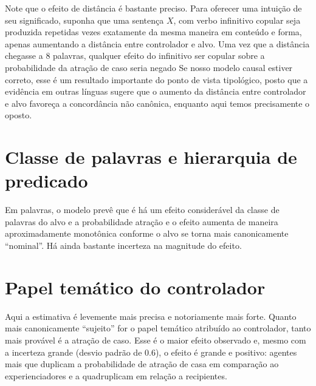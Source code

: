 \documentclass[a4paper, 12pt, article]{memoir}
\begin{document}
Note que o efeito de distância é bastante preciso.
Para oferecer uma intuição de seu significado, suponha que uma sentença $X$, com
verbo infinitivo copular seja produzida repetidas vezes exatamente da mesma
maneira em conteúdo e forma, apenas aumentando a distância entre controlador e
alvo.
Uma vez que a distância chegasse a 8 palavras, qualquer efeito do
infinitivo ser copular sobre a probabilidade da atração de caso seria negado
Se nosso modelo causal estiver correto, esse é um resultado importante do ponto
de vista tipológico, posto que a evidência em outras línguas sugere que o
aumento da distância entre controlador e alvo favoreça a concordância não
canônica, enquanto aqui temos precisamente o oposto.


\section{Classe de palavras e hierarquia de predicado} %

Em palavras, o modelo prevê que é há um efeito considerável da classe de
palavras do alvo e a probabilidade atração e o efeito aumenta de maneira
aproximadamente monotônica conforme o alvo se torna mais canonicamente
``nominal''.
Há ainda bastante incerteza na magnitude do efeito.

\begin{center}
  
  \bigskip
  
\end{center}


\section{Papel temático do controlador} %

Aqui a estimativa é levemente mais precisa e notoriamente mais forte.
Quanto mais canonicamente ``sujeito'' for o papel temático atribuído ao
controlador, tanto mais provável é a atração de caso.
Esse é o maior efeito observado e, mesmo com a incerteza grande (desvio padrão
de 0.6), o efeito é grande e positivo: agentes mais que duplicam a probabilidade
de atração de casa em comparação ao experienciadores e a quadruplicam em relação
a recipientes.

\begin{center}
  
  \bigskip
  
\end{center}
\end{document}
